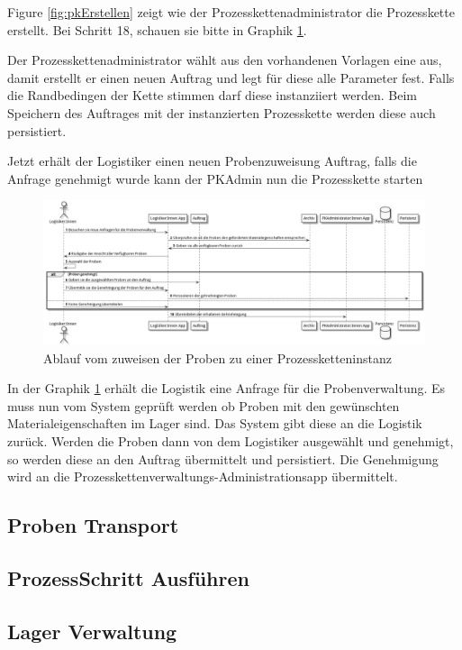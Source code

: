 \documentclass[enabledeprecatedfontcommands,fontsize=12pt,paper=a4,twoside]{scrartcl}
\begin{document}
{Figure \ref{fig:pkErstellen} zeigt wie der Prozesskettenadministrator die Prozesskette erstellt. 
Bei Schritt 18, schauen sie bitte in Graphik \ref{fig:logstikProbenPüftZuweisen}. 

Der Prozesskettenadministrator wählt aus den vorhandenen Vorlagen eine aus, damit erstellt er einen neuen Auftrag und legt für diese alle Parameter fest.
Falls die Randbedingen der Kette stimmen darf diese instanziiert werden. Beim Speichern des Auftrages mit der instanzierten Prozesskette werden diese auch persistiert.

Jetzt erhält der Logistiker einen neuen Probenzuweisung Auftrag, falls die Anfrage genehmigt wurde kann der PKAdmin nun die Prozesskette starten

\begin{figure}[H]
  \includegraphics[width=\linewidth]{UML/logstikProbenPueftZuweisen.png}
  \caption{Ablauf vom zuweisen der Proben zu einer Prozessketteninstanz}
  \label{fig:logstikProbenPüftZuweisen}
\end{figure}

In der Graphik \ref{fig:logstikProbenPüftZuweisen} erhält die Logistik eine Anfrage für die Probenverwaltung. Es muss nun vom System geprüft werden ob Proben mit den gewünschten Materialeigenschaften im Lager sind. Das System gibt diese an die Logistik zurück. Werden die Proben dann von dem Logistiker ausgewählt und genehmigt, so werden diese an den Auftrag übermittelt und persistiert. Die Genehmigung wird an die Prozesskettenverwaltungs-Administrationsapp übermittelt.

\subsection{Proben Transport}
\subsection{ProzessSchritt Ausführen}
\subsection{Lager Verwaltung}



}
\end{document}
